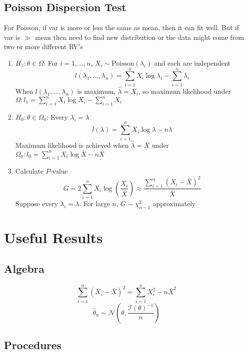 \documentclass{article}
\begin{document}
\begin{multicols}{2}
\subsection{Poisson Dispersion Test}
For Poisson, if var is more or less the same as mean, then it can fit well. But if var is $\gg$ mean then need to find new distribution or the data might come from two or more different RV's
\begin{enumerate}
	\item $H_1:\theta\in\Omega$: For $i=1,\dots,n$, $X_i\sim\text{Poisson}(\lambda_i)$ and each are independent
	$$l(\lambda_1,\dots,\lambda_n)=\sum_{i=1}^{n}X_i\log{\lambda_i}-\sum_{i=1}^n\lambda_i$$
	When $l(\lambda_1,\dots,\lambda_n)$ is maximum, $\hat{\lambda} = X_i$, so maximum likelihood under $\Omega:l_1=\sum_{i=1}^nX_i\log X_i - \sum_{i=1}^nX_i$
	\item $H_0:\theta\in\Omega_0$: Every $\lambda_i=\lambda$
	$$l(\lambda) = \sum_{i=1}^{n}X_i\log\lambda-n\lambda$$
	Maximum likelihood is achieved when $\hat{\lambda}=\bar{X}$ under $\Omega_0:l_0 =\sum_{i=1}^nX_i\log\bar{X}-n\bar{X}$
	\item Calculate $P$-value $$G=2\sum_{i=1}^{n}X_i\log\left(\frac{X_i}{\bar{X}}\right)\approx \frac{\sum_{i=1}^n(X_i-\bar{X})^2}{\bar{X}}$$
	Suppose every $\lambda_i=\lambda$. For large $n$, $G\sim\chi_{n-1}^2$ approximately
\end{enumerate}






\section{Useful Results}

\subsection{Algebra}
$$\sum_{i=1}^n(X_i-\bar{X})^2 = \sum_{i=1}^nX_i^2 - n\bar{X}^2$$
$$\hat{\theta}_n\sim\mathcal{N}\left(\theta, \frac{\mathcal{I}(\theta)^{-1}}{n}\right)$$
\subsection{Procedures}


\end{multicols}
\end{document}
